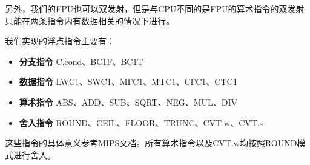另外，我们的FPU也可以双发射，但是与CPU不同的是FPU的算术指令的双发射只能在两条指令内有数据相关的情况下进行。

我们实现的浮点指令主要有：
\begin{itemize}
	\item \textbf{分支指令} C.cond、BC1F、BC1T
	\item \textbf{数据指令} LWC1、SWC1、MFC1、MTC1、CFC1、CTC1
	\item \textbf{算术指令} ABS、ADD、SUB、SQRT、NEG、MUL、DIV
	\item \textbf{舍入指令} ROUND、CEIL、FLOOR、TRUNC、CVT.w、CVT.s
\end{itemize}

	这些指令的具体意义参考MIPS文档。所有算术指令以及CVT.w均按照ROUND模式进行舍入。
